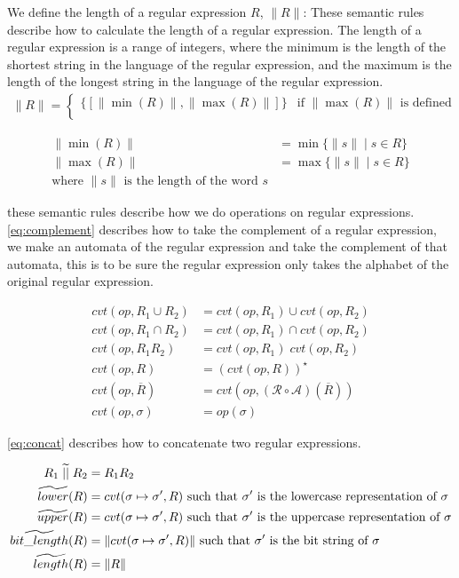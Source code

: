 We define the length of a regular expression $R$, $\|R\|$:
These semantic rules describe how to calculate the length of a regular expression.
The length of a regular expression is a range of integers, where the minimum is the length of the shortest string in the language of the regular expression, and the maximum is the length of the longest string in the language of the regular expression.
\begin{align}
    \|R\| = \begin{cases}
        \{ [\|\min(R)\|, \|\max(R)\|] \} & \text{if $\|\max(R)\|$ is defined} \\
    \end{cases}
\end{align}

\begin{align}
    \|\min(R)\| &= \min\{ \|s\| \mid s \in R \} \\
    \|\max(R)\| &= \max\{ \|s\| \mid s \in R \} \\
    \text{where $\|s\|$ is the length of the word $s$}
\end{align}

these semantic rules describe how we do operations on regular expressions.
\autoref{eq:complement} describes how to take the complement of a regular expression, we make an automata of the regular expression and take the complement of that automata, this is to be sure the regular expression only takes the alphabet of the original regular expression.

\begin{align}
    cvt(op, R_1 \cup R_2) &= cvt(op, R_1) \cup cvt(op, R_2) \\
    cvt(op, R_1 \cap R_2) &= cvt(op, R_1) \cap cvt(op, R_2) \\
    cvt(op, R_1R_2) &= cvt(op, R_1) \; cvt(op, R_2) \\
    cvt(op, R) &= (cvt(op, R))^\star \\
    cvt(op, \overline{R}) &= cvt(op, (\mathcal{R} \circ \mathcal{A}) (\overline{R})) \\ \label{eq:complement}
    cvt(op, \sigma) &= op(\sigma)
\end{align}

\autoref{eq:concat} describes how to concatenate two regular expressions.

\begin{align}
    R_1 \;\aab{||}\; R_2 &= R_1R_2 \\ \label{eq:concat}
    \aab{lower}(R) &= cvt(\sigma \mapsto \sigma', R) \text{ such that $\sigma'$ is the lowercase representation of $\sigma$}\\
    \aab{upper}(R) &= cvt(\sigma \mapsto \sigma', R) \text{ such that $\sigma'$ is the uppercase representation of $\sigma$}\\
    \aab{bit\_length}(R) &= \|cvt(\sigma \mapsto \sigma', R)\| \text{ such that $\sigma'$ is the bit string of $\sigma$} \\
    \aab{length}(R) &= \|R\|
\end{align}

